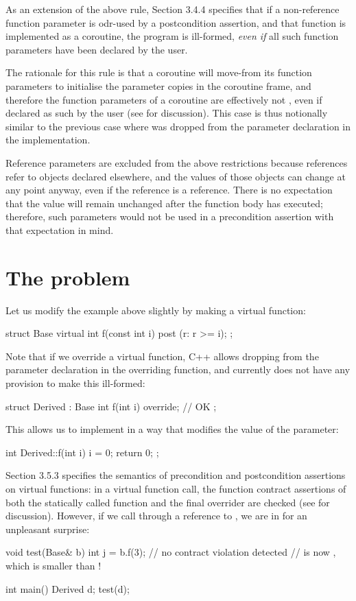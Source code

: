 As an extension of the above rule, \cite{P2900R10} Section 3.4.4 specifies that if a non-reference function parameter is odr-used by a postcondition assertion, and that function is implemented as a coroutine, the program is ill-formed, \emph{even if} all such function parameters have been declared  by the user.

The rationale for this rule is that a coroutine will move-from its function parameters to initialise the parameter copies in the coroutine frame, and therefore the function parameters of a coroutine are effectively not , even if declared as such by the user (see \cite{P3387R0} for discussion). This case is thus notionally similar to the previous case where  was dropped from the parameter declaration in the implementation.

Reference parameters are excluded from the above restrictions because references refer to objects declared elsewhere, and the values of those objects can change at any point anyway, even if the reference is a  reference. There is no expectation that the value will remain unchanged after the function body has executed; therefore, such parameters would not be used in a precondition assertion with that expectation in mind.

\section{The problem}

Let us modify the example above slightly by making  a virtual function:
\begin{codeblock}
struct Base {
  virtual int f(const int i) post (r: r >= i);
};
\end{codeblock}
Note that if we override a virtual function, C++ allows dropping  from the parameter declaration in the overriding function, and \cite{P2900R10} currently does not have any provision to make this ill-formed:
\begin{codeblock}
struct Derived : Base {
  int f(int i) override; // OK
};
\end{codeblock}
This allows us to implement  in a way that modifies the value of the parameter:
\begin{codeblock}
int Derived::f(int i) {
  i = 0;
  return 0;
};
\end{codeblock}
\cite{P2900R10} Section 3.5.3 specifies the semantics of precondition and postcondition assertions on virtual functions: in a virtual function call, the function contract assertions of both the statically called function  and the final overrider  are checked (see \cite{P3097R0} for discussion). However, if we call  through a reference to , we are in for an unpleasant surprise:
\begin{codeblock}
void test(Base& b) {
  int j = b.f(3);  // no contract violation detected
  //  is now , which is smaller than !
}

int main() {
  Derived d;
  test(d);
}
\end{codeblock}

